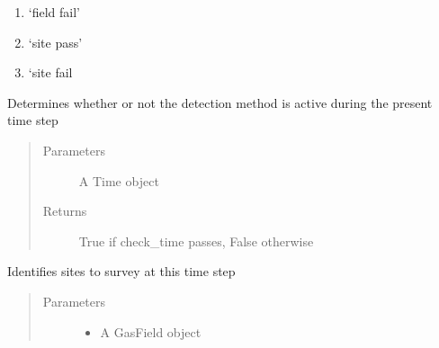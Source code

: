 \documentclass[letterpaper,10pt,english]{sphinxmanual}
\begin{document}
\begin{fulllineitems}
\begin{fulllineitems}
\begin{enumerate}
\item {} 
‘field fail’

\item {} 
‘site pass’

\item {} 
‘site fail

\end{enumerate}

\end{fulllineitems}


\begin{fulllineitems}
\label{\detokenize{index:feast.DetectionModules.abstract_detection_method.DetectionMethod.check_time}}
Determines whether or not the detection method is active during the present time step
\begin{quote}\begin{description}
\item[{Parameters}] \leavevmode
{} \textendash{} A Time object

\item[{Returns}] \leavevmode
True if check\_time passes, False otherwise

\end{description}\end{quote}

\end{fulllineitems}


\begin{fulllineitems}
\label{\detokenize{index:feast.DetectionModules.abstract_detection_method.DetectionMethod.choose_sites}}
Identifies sites to survey at this time step
\begin{quote}\begin{description}
\item[{Parameters}] \leavevmode\begin{itemize}
\item {} 
 \textendash{} A GasField object


\end{itemize}
\end{description}
\end{quote}
\end{fulllineitems}
\end{fulllineitems}
\end{document}
